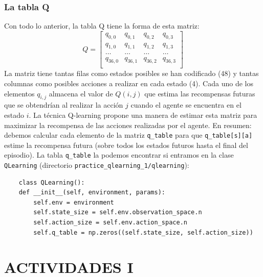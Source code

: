 \documentclass{article}
\begin{document}




\subsubsection{La tabla Q}
Con todo lo anterior, la tabla Q tiene la forma de esta matriz:
\begin{equation*}
    Q = \begin{bmatrix}
            q_{0,0} & q_{0,1} & q_{0,2} & q_{0,3}\\
            q_{1,0} & q_{1,1} & q_{1,2} & q_{1,3}\\
            \ldots & \ldots & \ldots & \ldots\\
            q_{36,0} & q_{36,1} & q_{36,2} & q_{36,3}\\
        \end{bmatrix}
\end{equation*}
La matriz tiene tantas filas como estados posibles se han codificado (48) y tantas columnas como posibles acciones a realizar en cada estado (4). Cada uno de los elementos $q_{i,j}$ almacena el valor de $Q(i, j)$ que estima las recompensas futuras que se obtendrían al realizar la acción $j$ cuando el agente se encuentra en el estado $i$. La técnica Q-learning propone una manera de estimar esta matriz para maximizar la recompensa de las acciones realizadas por el agente. En resumen: debemos calcular cada elemento de la matriz \texttt{q\_table} para que \texttt{q\_table[s][a]} estime la recompensa futura (sobre todos los estados
futuros hasta el final del episodio). La tabla \texttt{q\_table} la podemos encontrar si entramos en la clase \texttt{QLearning} (directorio \texttt{practice\_qlearning\_1/qlearning}):
\begin{verbatim}
    class QLearning():
    def __init__(self, environment, params):
        self.env = environment
        self.state_size = self.env.observation_space.n
        self.action_size = self.env.action_space.n
        self.q_table = np.zeros((self.state_size, self.action_size))
\end{verbatim}




\section{ACTIVIDADES I}
\end{document}
